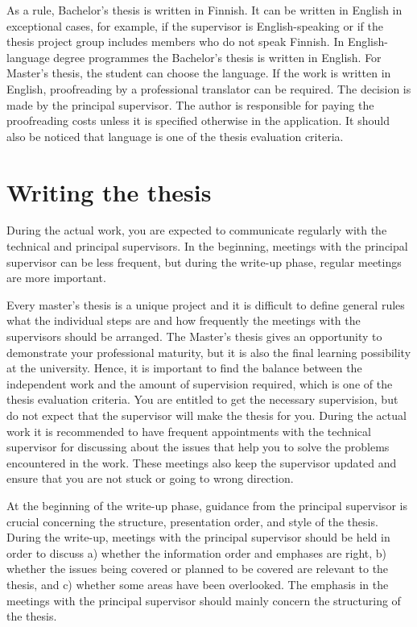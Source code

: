 As a rule, Bachelor's thesis is written in Finnish. It can be written in English in exceptional cases, for example, if the supervisor is English-speaking or if the thesis project group includes members who do not speak Finnish. In English-language degree programmes the Bachelor's thesis is written in English. For Master's thesis, the student can choose the language. If the work is written in English, proofreading by a professional translator can be required. The decision is made by the principal supervisor. The author is responsible for paying the proofreading costs unless it is specified otherwise in the application. It should also be noticed that language is one of the thesis evaluation criteria.

\section{Writing the thesis}
\label{writing}

During the actual work, you are expected to communicate regularly with the technical and principal supervisors. In the beginning, meetings with the principal supervisor can be less frequent, but during the write-up phase, regular meetings are more important.

Every master’s thesis is a unique project and it is difficult to define general rules what the individual steps are and how frequently the meetings with the supervisors should be arranged. The Master's thesis gives an opportunity to demonstrate your professional maturity, but it is also the final learning possibility at the university. Hence, it is important to find the balance between the independent work and the amount of supervision required, which is one of the thesis evaluation criteria. You are entitled to get the necessary supervision, but do not expect that the supervisor will make the thesis for you. During the actual work it is recommended to have frequent appointments with the technical supervisor for discussing about the issues that help you to solve the problems encountered in the work. These meetings also keep the supervisor updated and ensure that you are not stuck or going to wrong direction.

At the beginning of the write-up phase, guidance from the principal supervisor is crucial concerning the structure, presentation order, and style of the thesis. During the write-up, meetings with the principal supervisor should be held in order to discuss a) whether the information order and emphases are right, b) whether the issues being covered or planned to be covered are relevant to the thesis, and c) whether some areas have been overlooked. The emphasis in the meetings with the principal supervisor should mainly concern the structuring of the thesis.

